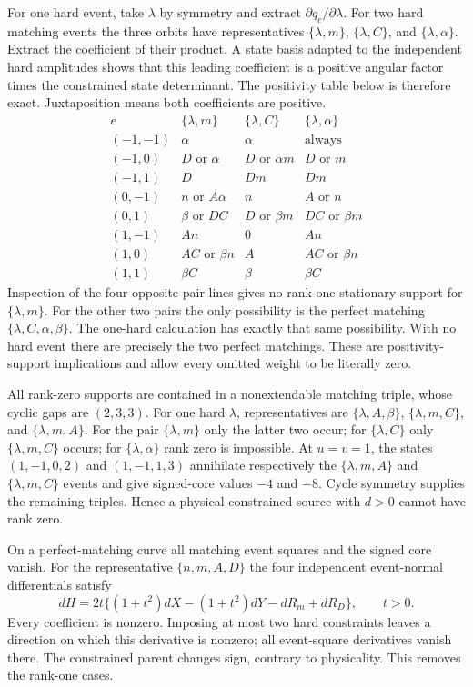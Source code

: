 \documentclass[11pt]{article}
\begin{document}
For one hard event, take $\lambda$ by symmetry and extract
$\partial q_e/\partial\lambda$. For two hard matching events the three
orbits have representatives $\{\lambda,m\}$, $\{\lambda,C\}$,
and $\{\lambda,\alpha\}$. Extract the coefficient of their product.
A state basis adapted to the independent hard amplitudes shows that this
leading coefficient is a positive angular factor times the constrained
state determinant. The positivity table below is therefore exact.
Juxtaposition means both coefficients are positive.
\[
\begin{array}{c|ccc}
e&\{\lambda,m\}&\{\lambda,C\}&\{\lambda,\alpha\}\\\hline
(-1,-1)&\alpha&\alpha&\text{always}\\
(-1,0)&D\text{ or }\alpha&D\text{ or }\alpha m&D\text{ or }m\\
(-1,1)&D&Dm&Dm\\
(0,-1)&n\text{ or }A\alpha&n&A\text{ or }n\\
(0,1)&\beta\text{ or }DC&D\text{ or }\beta m&DC\text{ or }\beta m\\
(1,-1)&An&0&An\\
(1,0)&AC\text{ or }\beta n&A&AC\text{ or }\beta n\\
(1,1)&\beta C&\beta&\beta C
\end{array}
\]
Inspection of the four opposite-pair lines gives no rank-one stationary
support for $\{\lambda,m\}$. For the other two pairs the only
possibility is the perfect matching
$\{\lambda,C,\alpha,\beta\}$. The one-hard calculation has exactly
that same possibility. With no hard event there are precisely the two
perfect matchings. These are positivity-support implications and allow
every omitted weight to be literally zero.

All rank-zero supports are contained in a nonextendable matching triple,
whose cyclic gaps are $(2,3,3)$. For one hard $\lambda$, representatives
are $\{\lambda,A,\beta\}$, $\{\lambda,m,C\}$, and
$\{\lambda,m,A\}$. For the pair $\{\lambda,m\}$ only the latter
two occur; for $\{\lambda,C\}$ only $\{\lambda,m,C\}$ occurs;
for $\{\lambda,\alpha\}$ rank zero is impossible. At $u=v=1$, the
states $(1,-1,0,2)$ and $(1,-1,1,3)$ annihilate respectively the
$\{\lambda,m,A\}$ and $\{\lambda,m,C\}$ events and give signed-core
values $-4$ and $-8$. Cycle symmetry supplies the remaining triples.
Hence a physical constrained source with $d>0$ cannot have rank zero.

On a perfect-matching curve all matching event squares and the signed
core vanish. For the representative $\{n,m,A,D\}$ the four independent
event-normal differentials satisfy
\[
dH=2t\{(1+t^2)dX-(1+t^2)dY-dR_m+dR_D\},\qquad t>0.
\]
Every coefficient is nonzero. Imposing at most two hard constraints
leaves a direction on which this derivative is nonzero; all event-square
derivatives vanish there. The constrained parent changes sign, contrary
to physicality. This removes the rank-one cases.
\end{document}
